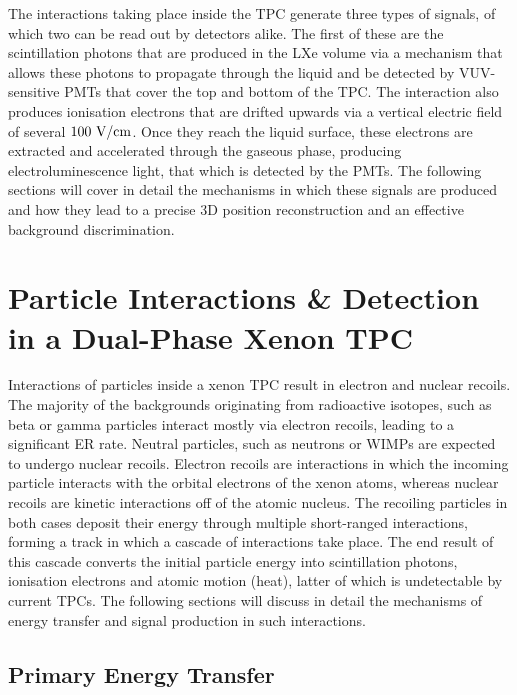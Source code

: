 %

The interactions taking place inside the TPC generate three types of signals, of which two can be read out by detectors alike. The first of these are the scintillation photons that are produced in the LXe volume via a mechanism that allows these photons to propagate through the liquid and be detected by VUV-sensitive PMTs that cover the top and bottom of the TPC. The interaction also produces ionisation electrons that are drifted upwards via a vertical electric field of several $100 \text{ V/cm}$. Once they reach the liquid surface, these electrons are extracted and accelerated through the gaseous phase, producing electroluminescence light, that which is detected by the PMTs. The following sections will cover in detail the mechanisms in which these signals are produced and how they lead to a precise 3D position reconstruction and an effective background discrimination. 


\section{Particle Interactions \& Detection in a Dual-Phase Xenon TPC}
\label{sec:xenonphysics}

Interactions of particles inside a xenon TPC result in electron and nuclear recoils. The majority of the backgrounds originating from radioactive isotopes, such as beta or gamma particles interact mostly via electron recoils, leading to a significant ER rate. Neutral particles, such as neutrons or WIMPs are expected to undergo nuclear recoils. Electron recoils are interactions in which the incoming particle interacts with the orbital electrons of the xenon atoms, whereas nuclear recoils are kinetic interactions off of the atomic nucleus. The recoiling particles in both cases deposit their energy through multiple short-ranged interactions, forming a track in which a cascade of interactions take place. The end result of this cascade converts the initial particle energy into scintillation photons, ionisation electrons and atomic motion (heat), latter of which is undetectable by current TPCs. The following sections will discuss in detail the mechanisms of energy transfer and signal production in such interactions.

\subsection{Primary Energy Transfer}
\label{sec:energy_transfer}

